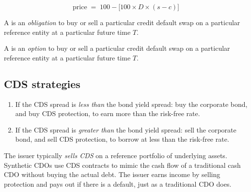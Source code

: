 \begin{crfmlbox}
\[ \text{price} \;=\; 100 - \bigl[100 \times D \times (s - c)\bigr] \]
\end{crfmlbox}


\begin{crdefbox}
A  is an \emph{obligation} to buy or sell a particular credit
default swap on a particular reference entity at a particular future time $T$.

\smallskip
A  is an \emph{option} to buy or sell a particular credit default
swap on a particular reference entity at a particular future time $T$.
\end{crdefbox}

\subsection*{CDS strategies}

\begin{enumerate}
\item If the CDS spread is \emph{less than} the bond yield spread: buy the
corporate bond, and buy CDS protection, to earn more than the risk-free rate.
\item If the CDS spread is \emph{greater than} the bond yield spread: sell the
corporate bond, and sell CDS protection, to borrow at less than the risk-free
rate.
\end{enumerate}


\begin{crdefbox}
The issuer typically \emph{sells CDS} on a reference portfolio of underlying
assets. Synthetic CDOs use CDS contracts to mimic the cash flow of a traditional
cash CDO without buying the actual debt. The issuer earns income by selling
protection and pays out if there is a default, just as a traditional CDO does.
\end{crdefbox}

